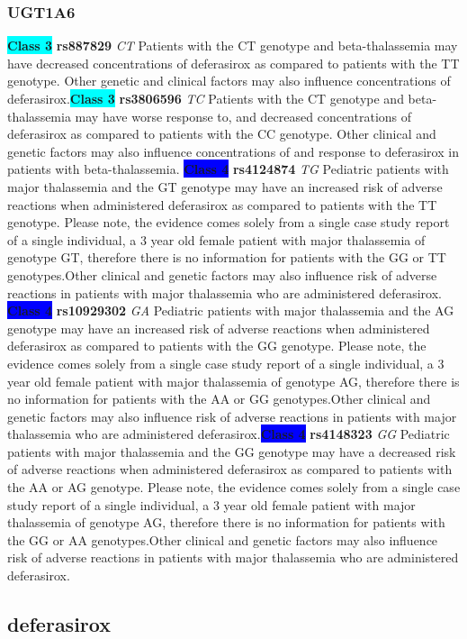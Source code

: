 \documentclass{book}
\begin{document}
\subsubsection{ UGT1A6 }

\begin{center}
\textbf{\colorbox{cyan} {Class 3}} \textbf{ rs887829 } \textit{ CT }
Patients with the CT genotype and beta-thalassemia may have decreased concentrations of deferasirox as compared to patients with the TT genotype. Other genetic and clinical factors may also influence concentrations of deferasirox.\textbf{\colorbox{cyan} {Class 3}} \textbf{ rs3806596 } \textit{ TC }
Patients with the CT genotype and beta-thalassemia may have worse response to, and decreased concentrations of deferasirox as compared to patients with the CC genotype. Other clinical and genetic factors may also influence concentrations of and response to deferasirox in patients with beta-thalassemia.
\textbf{\colorbox{blue} {Class 4}} \textbf{ rs4124874 } \textit{ TG }
Pediatric patients with major thalassemia and the GT genotype may have an increased risk of adverse reactions when administered deferasirox as compared to patients with the TT genotype. Please note, the evidence comes solely from a single case study report of a single individual, a 3 year old female patient with major thalassemia of genotype GT, therefore there is no information for patients with the GG or TT genotypes.Other clinical and genetic factors may also influence risk of adverse reactions in patients with major thalassemia who are administered deferasirox. \textbf{\colorbox{blue} {Class 4}} \textbf{ rs10929302 } \textit{ GA }
Pediatric patients with major thalassemia and the AG genotype may have an increased risk of adverse reactions when administered deferasirox as compared to patients with the GG genotype. Please note, the evidence comes solely from a single case study report of a single individual, a 3 year old female patient with major thalassemia of genotype AG, therefore there is no information for patients with the AA or GG genotypes.Other clinical and genetic factors may also influence risk of adverse reactions in patients with major thalassemia who are administered deferasirox.\textbf{\colorbox{blue} {Class 4}} \textbf{ rs4148323 } \textit{ GG }
Pediatric patients with major thalassemia and the GG genotype may have a decreased risk of adverse reactions when administered deferasirox as compared to patients with the AA or AG genotype. Please note, the evidence comes solely from a single case study report of a single individual, a 3 year old female patient with major thalassemia of genotype AG, therefore there is no information for patients with the GG or AA genotypes.Other clinical and genetic factors may also influence risk of adverse reactions in patients with major thalassemia who are administered deferasirox.

\end{center}\subsection{ deferasirox }
\end{document}

